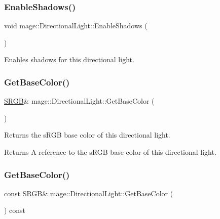 \subsubsection{\texorpdfstring{Enable\+Shadows()}{EnableShadows()}}
{\footnotesize\ttfamily void mage\+::\+Directional\+Light\+::\+Enable\+Shadows (\begin{DoxyParamCaption}{ }\end{DoxyParamCaption})\hspace{0.3cm}{\ttfamily [noexcept]}}

Enables shadows for this directional light. \hypertarget{classmage_1_1_directional_light_a7830f2407803a37512e94c0e2b6e7276}{}\label{classmage_1_1_directional_light_a7830f2407803a37512e94c0e2b6e7276} 
\subsubsection{\texorpdfstring{Get\+Base\+Color()}{GetBaseColor()}\hspace{0.1cm}{\footnotesize\ttfamily [1/2]}}
{\footnotesize\ttfamily \hyperlink{structmage_1_1_s_r_g_b}{S\+R\+GB}\& mage\+::\+Directional\+Light\+::\+Get\+Base\+Color (\begin{DoxyParamCaption}{ }\end{DoxyParamCaption})\hspace{0.3cm}{\ttfamily [noexcept]}}

Returns the s\+R\+GB base color of this directional light.

\begin{DoxyReturn}{Returns}
A reference to the s\+R\+GB base color of this directional light. 
\end{DoxyReturn}
\hypertarget{classmage_1_1_directional_light_ab9e6a54f3e9b527674283e5678a86d29}{}\label{classmage_1_1_directional_light_ab9e6a54f3e9b527674283e5678a86d29} 
\subsubsection{\texorpdfstring{Get\+Base\+Color()}{GetBaseColor()}\hspace{0.1cm}{\footnotesize\ttfamily [2/2]}}
{\footnotesize\ttfamily const \hyperlink{structmage_1_1_s_r_g_b}{S\+R\+GB}\& mage\+::\+Directional\+Light\+::\+Get\+Base\+Color (\begin{DoxyParamCaption}{ }\end{DoxyParamCaption}) const\hspace{0.3cm}{\ttfamily [noexcept]}}

